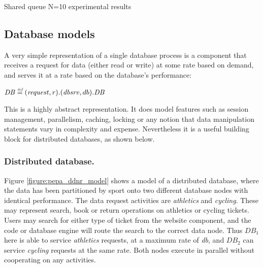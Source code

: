 \begin{table}[h!]
	\begin{center}
		\caption{Shared queue N=10 experimental results}
		\label{table:queue_results}
	\end{center}
\end{table}

%
%
\FloatBarrier
\subsection{Database models}
A very simple representation of a single database process is a component that receives a request for data (either read or write) at some rate based on demand, and serves it at a rate based on the database's performance:
\begin{center}
$\mathit{DB} \stackrel{\mbox{\em {\tiny def}}}{=} (\mathit{request}, r).(\mathit{dbsrv}, db).\mathit{DB}$
\end{center}
This is a highly abstract representation.  It does model features such as session management, parallelism, caching, locking or any notion that data manipulation statements vary in complexity and expense.  Nevertheless it is a useful building block for distributed databases, as shown below.

%
%
\FloatBarrier
\subsubsection{Distributed database.} Figure \ref{figure:pepa_ddnr_model} shows a model of a distributed database, where the data has been partitioned by sport onto two different database nodes with identical performance.  The data request activities are {\itshape athletics} and {\itshape cycling}.  These may represent search, book or return operations on athletics or cycling tickets.  Users may search for either type of ticket from the website component, and the code or database engine will route the search to the correct data node.  Thus $\mathit{DB_1}$ here is able to service {\itshape athletics} requests, at a maximum rate of {\itshape db}, and $\mathit{DB_2}$ can service {\itshape cycling} requests at the same rate.  Both nodes execute in parallel without cooperating on any activities.

